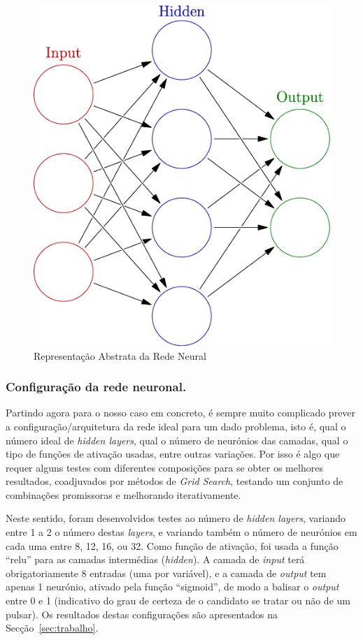 \documentclass[]{article}
\begin{document}
    \begin{figure}[H]
    \centering
    \includegraphics[scale=.7]{img/neural_network.png}
    \caption{Representação Abstrata da Rede Neural}
    \end{figure}
    
\subsubsection{Configuração da rede neuronal.}
    Partindo agora para o nosso caso em concreto, é sempre muito complicado prever a configuração/arquitetura da rede ideal para um dado problema, isto é, qual o número ideal de \textit{hidden layers}, qual o número de neurónios das camadas, qual o tipo de funções de ativação usadas, entre outras variações. Por isso é algo que requer alguns testes com diferentes composições para se obter os melhores resultados, coadjuvados por métodos de \textit{Grid Search}, testando um conjunto de combinações promissoras e melhorando iterativamente.
    
    Neste sentido, foram desenvolvidos testes ao número de \textit{hidden layers}, variando entre 1 a 2 o número destas \textit{layers}, e variando também o número de neurónios em cada uma entre 8, 12, 16, ou 32. Como função de ativação, foi usada a função ``relu'' para as camadas intermédias (\textit{hidden}).
    A camada de \textit{input} terá obrigatoriamente 8 entradas (uma por variável), e a camada de \textit{output} tem apenas 1 neurónio, ativado pela função ``sigmoid'', de modo a balisar o \textit{output} entre 0 e 1 (indicativo do grau de certeza de o candidato se tratar ou não de um pulsar).
    Os resultados destas configurações são apresentados na Secção~\ref{sec:trabalho}.
\end{document}
